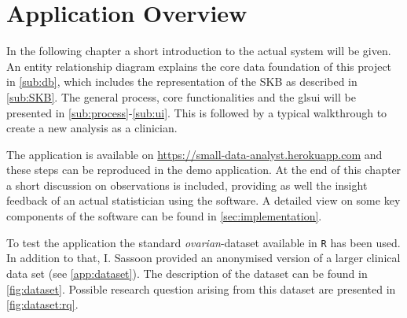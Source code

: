 \section{Application Overview}
\label{sec:app}
In the following chapter a short introduction to the actual system will be given. An entity relationship diagram explains the core data foundation of this project in \autoref{sub:db}, which includes the representation of the \gls{SKB} as described in \autoref{sub:SKB}. The general process, core functionalities and the gls{ui} will be presented in \autoref{sub:process}-\ref{sub:ui}. This is followed by a typical walkthrough to create a new analysis as a clinician. 

The application is available on \href{https://small-data-analyst.herokuapp.com}{https://small-data-analyst.herokuapp.com} and these steps can be reproduced in the demo application. At the end of this chapter a short discussion on observations is included, providing as well the insight feedback of an actual statistician using the software. A detailed view on some key components of the software can be found in \autoref{sec:implementation}.


To test the application the standard \textit{ovarian}-dataset available in \texttt{R} has been used. In addition to that, I. Sassoon provided an anonymised version of a larger clinical data set (see \autoref{app:dataset}). The description of the dataset can be found in \autoref{fig:dataset}. Possible research question arising from this dataset are presented in \autoref{fig:dataset:rq}.













